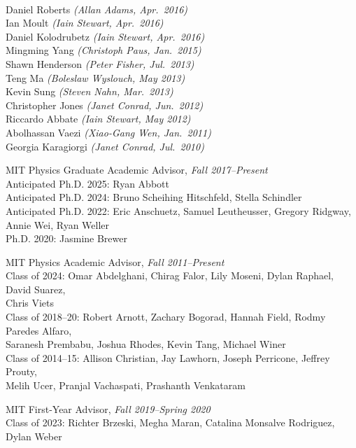 \documentclass[11pt]{article}
\newcommand{\sh}{\phantom{...}}
\begin{document}
\\ \sh Daniel Roberts \textit{(Allan Adams, Apr.~2016)}
\\ \sh Ian Moult \textit{(Iain Stewart, Apr.~2016)}
\\ \sh Daniel Kolodrubetz \textit{(Iain Stewart, Apr.~2016)}
\\ \sh Mingming Yang \textit{(Christoph Paus, Jan.~2015)}
\\ \sh  Shawn Henderson \textit{(Peter Fisher, Jul.~2013)}
\\ \sh  Teng Ma \textit{(Boleslaw Wyslouch, May 2013)}
\\ \sh  Kevin Sung \textit{(Steven Nahn, Mar.~2013)}
\\ \sh  Christopher Jones \textit{(Janet Conrad, Jun.~2012)}
\\ \sh  Riccardo Abbate \textit{(Iain Stewart, May 2012)}
\\ \sh  Abolhassan Vaezi \textit{(Xiao-Gang Wen, Jan.~2011)}
\\ \sh  Georgia Karagiorgi \textit{(Janet Conrad, Jul.~2010)}
\item MIT Physics Graduate Academic Advisor,  \textit{Fall 2017--Present}
\\ \sh Anticipated Ph.D. 2025: Ryan Abbott
\\ \sh Anticipated Ph.D. 2024:  Bruno Scheihing Hitschfeld, Stella Schindler
\\ \sh Anticipated Ph.D. 2022: Eric Anschuetz, Samuel Leutheusser, Gregory Ridgway, 
\\ \sh \sh Annie Wei, Ryan Weller
\\ \sh Ph.D. 2020: Jasmine Brewer
\item MIT Physics Academic Advisor, \textit{Fall 2011--Present}
\\ \sh Class of 2024: Omar Abdelghani, Chirag Falor, Lily Moseni, Dylan Raphael, David Suarez,
\\ \sh \sh Chris Viets
\\ \sh Class of 2018--20: Robert Arnott, Zachary Bogorad, Hannah Field, Rodmy Paredes Alfaro, 
\\ \sh \sh Saranesh Prembabu, Joshua Rhodes,  Kevin Tang, Michael Winer
\\ \sh Class of 2014--15:  Allison Christian, Jay Lawhorn, Joseph Perricone, Jeffrey Prouty,
\\ \sh \sh Melih Ucer, Pranjal Vachaspati, Prashanth Venkataram
\item MIT First-Year Advisor, \textit{Fall 2019--Spring 2020}
\\ \sh Class of 2023:  Richter Brzeski, Megha Maran, Catalina Monsalve Rodriguez, Dylan Weber
\end{document}
